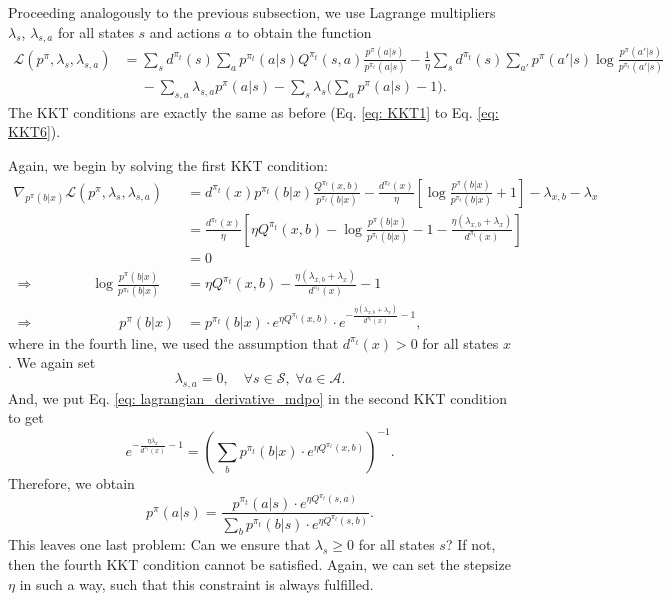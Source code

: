 \documentclass[a4paper, 10pt]{article}
\begin{document}
Proceeding analogously to the previous subsection, we use Lagrange multipliers $\lambda_s$, $\lambda_{s, a}$ for all states $s$ and actions $a$ to obtain the function
\begin{align}
  \mathcal{L}(p^\pi, \lambda_s, \lambda_{s, a}) &= \sum_s d^{\pi_t}(s) \sum_a p^{\pi_t}(a|s) Q^{\pi_t}(s, a) \frac{p^\pi(a | s)}{p^{\pi_t}(a | s)} - \frac{1}{\eta} \sum_s d^{\pi_t}(s) \sum_{a'} p^\pi(a' | s) \log \frac{p^\pi(a' | s)}{p^{\pi_t}(a' | s)} \nonumber \\
  & \quad \; - \sum_{s, a} \lambda_{s, a} p^\pi(a | s) - \sum_s \lambda_{s} \bigg( \sum_a p^\pi(a | s) - 1 \bigg).
\end{align}
The KKT conditions are exactly the same as before (Eq. \ref{eq: KKT1} to Eq. \ref{eq: KKT6}).

Again, we begin by solving the first KKT condition:
\begin{align}
  \nabla_{p^\pi(b | x)} \mathcal{L}(p^\pi, \lambda_s, \lambda_{s, a}) &= d^{\pi_t}(x) p^{\pi_t}(b|x) \frac{Q^{\pi_t}(x, b)}{p^{\pi_t}(b | x)} - \frac{d^{\pi_t}(x)}{\eta} \left[ \log \frac{p^\pi(b | x)}{p^{\pi_t}(b | x)} + 1 \right] - \lambda_{x, b} - \lambda_x \nonumber \\
  &= \frac{d^{\pi_t}(x)}{\eta} \left[ \eta Q^{\pi_t}(x, b) - \log \frac{p^\pi(b | x)}{p^{\pi_t}(b | x)} - 1 - \frac{\eta (\lambda_{x, b} + \lambda_x)}{d^{\pi_t}(x)} \right] \nonumber \\
  &= 0 \nonumber \\
  \Rightarrow \qquad \qquad \log \frac{p^\pi(b | x)}{p^{\pi_t}(b | x)} &= \eta Q^{\pi_t}(x, b) - \frac{\eta (\lambda_{x, b} + \lambda_x)}{d^{\pi_t}(x)} - 1 \nonumber \\
  \Rightarrow \qquad \qquad \qquad p^\pi(b | x) &= p^{\pi_t}(b | x) \cdot e^{\eta Q^{\pi_t}(x, b)} \cdot e^{- \frac{\eta (\lambda_{x, b} + \lambda_x)}{d^{\pi_t}(x)} - 1}, \label{eq: lagrangian_derivative_mdpo}
\end{align}
where in the fourth line, we used the assumption that $d^{\pi_t}(x) > 0$ for all states $x$. We again set
\begin{equation}
  \lambda_{s, a} = 0, \quad \forall s \in \mathcal{S}, \; \forall a \in \mathcal{A}.
\end{equation}
And, we put Eq. \ref{eq: lagrangian_derivative_mdpo} in the second KKT condition to get
\begin{equation}
  e^{- \frac{\eta \lambda_x}{d^{\pi_t}(x)} - 1} = \left( \sum_b p^{\pi_t}(b | x) \cdot e^{\eta Q^{\pi_t}(x, b)} \right)^{-1}.
\end{equation}
Therefore, we obtain
\begin{equation}
  p^\pi(a | s) = \frac{p^{\pi_t}(a | s) \cdot e^{\eta Q^{\pi_t}(s, a)}}{\sum_b p^{\pi_t}(b | s) \cdot e^{\eta Q^{\pi_t}(s, b)}}.
\end{equation}
This leaves one last problem: Can we ensure that $\lambda_s \geq 0$ for all states $s$? If not, then the fourth KKT condition cannot be satisfied. Again, we can set the stepsize $\eta$ in such a way, such that this constraint is always fulfilled.
\end{document}
